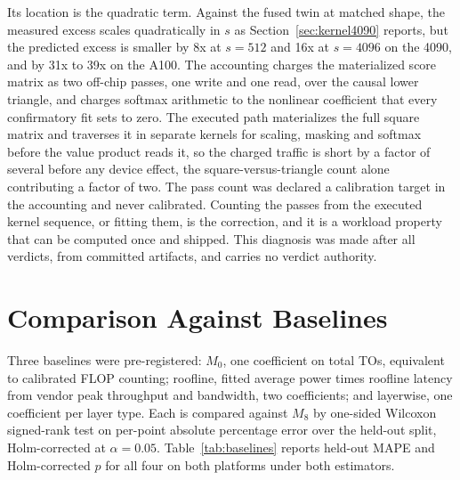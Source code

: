 \documentclass[conference]{IEEEtran}
\begin{document}
Its location is the quadratic term. Against the fused twin at matched
shape, the measured excess scales quadratically in $s$ as
Section~\ref{sec:kernel4090} reports, but the predicted excess is smaller
by 8x at $s = 512$ and 16x at $s = 4096$ on the 4090, and by 31x to 39x on
the A100. The accounting charges the materialized score matrix as two
off-chip passes, one write and one read, over the causal lower triangle,
and charges softmax arithmetic to the nonlinear coefficient that every
confirmatory fit sets to zero. The executed path materializes the full
square matrix and traverses it in separate kernels for scaling, masking and
softmax before the value product reads it, so the charged traffic is short
by a factor of several before any device effect, the square-versus-triangle
count alone contributing a factor of two. The pass count was declared a
calibration target in the accounting and never calibrated. Counting the
passes from the executed kernel sequence, or fitting them, is the
correction, and it is a workload property that can be computed once and
shipped. This diagnosis was made after all verdicts, from committed
artifacts, and carries no verdict authority.

\section{Comparison Against Baselines}
\label{sec:baselines}

Three baselines were pre-registered: $M_0$, one coefficient on total TOs,
equivalent to calibrated FLOP counting; roofline, fitted average power
times roofline latency from vendor peak throughput and bandwidth, two
coefficients; and layerwise, one coefficient per layer type. Each is
compared against $M_8$ by one-sided Wilcoxon signed-rank test on per-point
absolute percentage error over the held-out split, Holm-corrected at
$\alpha = 0.05$. Table~\ref{tab:baselines} reports held-out MAPE and
Holm-corrected $p$ for all four on both platforms under both estimators.
\end{document}
